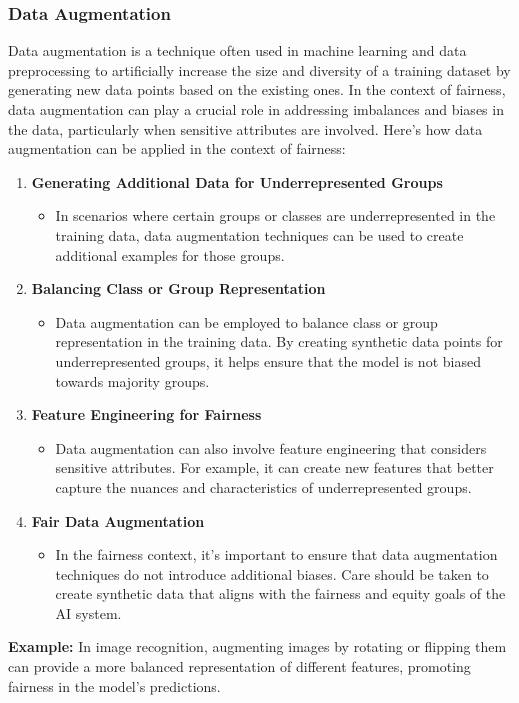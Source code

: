\documentclass[12pt,a4paper,openright,twoside]{book}
\begin{document}
\subsubsection{Data Augmentation}
Data augmentation is a technique often used in machine learning and data preprocessing to artificially increase the size and diversity of a training dataset by generating new data points based on the existing ones. In the context of fairness, data augmentation can play a crucial role in addressing imbalances and biases in the data, particularly when sensitive attributes are involved. Here's how data augmentation can be applied in the context of fairness:
\begin{enumerate}
    \item \textbf{Generating Additional Data for Underrepresented Groups}
    \begin{itemize}
        \item In scenarios where certain groups or classes are underrepresented in the training data, data augmentation techniques can be used to create additional examples for those groups. \cite{sharma2020data}
    \end{itemize}
    \item \textbf{Balancing Class or Group Representation}
    \begin{itemize}
        \item Data augmentation can be employed to balance class or group representation in the training data. By creating synthetic data points for underrepresented groups, it helps ensure that the model is not biased towards majority groups.
    \end{itemize}
    \item \textbf{Feature Engineering for Fairness}
    \begin{itemize}
        \item Data augmentation can also involve feature engineering that considers sensitive attributes. For example, it can create new features that better capture the nuances and characteristics of underrepresented groups. \cite{10.14778/3461535.3463474}
    \end{itemize}
    \item \textbf{Fair Data Augmentation}
    \begin{itemize}
        \item In the fairness context, it's important to ensure that data augmentation techniques do not introduce additional biases. Care should be taken to create synthetic data that aligns with the fairness and equity goals of the AI system. \cite{10.1145/3531146.3534644}
    \end{itemize}
\end{enumerate}
\textbf{Example:} In image recognition, augmenting images by rotating or flipping them can provide a more balanced representation of different features, promoting fairness in the model's predictions.
\end{document}
